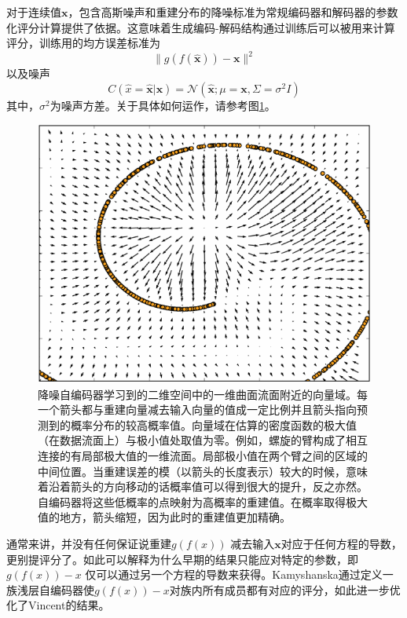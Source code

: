 对于连续值$\bm{x}$，包含高斯噪声和重建分布的降噪标准为常规编码器和解码器的参数化评分计算提供了依据。这意味着生成编码-解码结构通过训练后可以被用来计算评分，训练用的均方误差标准为
\begin{equation}
	\|g(f(\bm{\hat{x}})) - \bm{x}\|^2
\end{equation}
以及噪声
\begin{equation}
	C(\hat{x} = \bm{\hat{x}} | \bm{x}) = \mathcal{N}(\bm{\hat{x}}; \mu = \bm{x}, \Sigma = \sigma^2I)
\end{equation}
其中，$\sigma^2$为噪声方差。关于具体如何运作，请参考图\ref{fig:14.5}。
\begin{figure}[htbp] %
   \centering
   \includegraphics[width=4.5in]{fig/chap14/14_5.png} 
   \caption{降噪自编码器学习到的二维空间中的一维曲面流面附近的向量域。每一个箭头都与重建向量减去输入向量的值成一定比例并且箭头指向预测到的概率分布的较高概率值。向量域在估算的密度函数的极大值（在数据流面上）与极小值处取值为零。例如，螺旋的臂构成了相互连接的有局部极大值的一维流面。局部极小值在两个臂之间的区域的中间位置。当重建误差的模（以箭头的长度表示）较大的时候，意味着沿着箭头的方向移动的话概率值可以得到很大的提升，反之亦然。自编码器将这些低概率的点映射为高概率的重建值。在概率取得极大值的地方，箭头缩短，因为此时的重建值更加精确。}
   \label{fig:14.5}
\end{figure}

通常来讲，并没有任何保证说重建$g(f(x))$ 减去输入$\bm{x}$对应于任何方程的导数，更别提评分了。如此可以解释为什么早期的结果只能应对特定的参数，即$g(f(x)) - x$ 仅可以通过另一个方程的导数来获得。Kamyshanska通过定义一族浅层自编码器使$g(f(x)) - x$对族内所有成员都有对应的评分，如此进一步优化了Vincent的结果。

